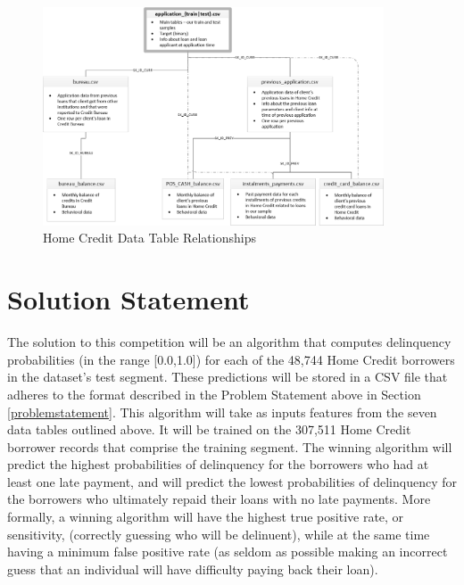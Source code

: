 \documentclass[12pt, letterpaper]{article}
\begin{document}
\begin{figure}[ht]
\includegraphics[width=0.9\textwidth]{homecredit}
\centering
\caption{Home Credit Data Table Relationships\cite{kagglehomecreditcompetitiondata}}
\end{figure}

\section{Solution Statement}
The solution to this competition will be an algorithm that computes delinquency probabilities (in the range [0.0,1.0]) for each of the 48,744 Home Credit borrowers in the dataset's test segment. These predictions will be stored in a CSV file that adheres to the format described in the Problem Statement above in Section \ref{problemstatement}. This algorithm will take as inputs features from the seven data tables outlined above. It will be trained on the 307,511 Home Credit borrower records that comprise the training segment. The winning algorithm will predict the highest probabilities of delinquency for the borrowers who had at least one late payment, and will predict the lowest probabilities of delinquency for the borrowers who ultimately repaid their loans with no late payments. More formally, a winning algorithm will have the highest true positive rate, or sensitivity, (correctly guessing who will be delinuent), while at the same time having a minimum false positive rate (as seldom as possible making an incorrect guess that an individual will have difficulty paying back their loan).
\end{document}

